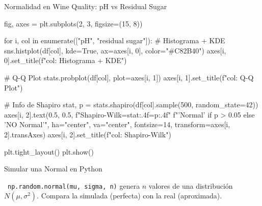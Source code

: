 \documentclass[aspectratio=169, 11pt]{beamer}
\begin{document}
\begin{frame}[fragile,shrink=28]{Normalidad en Wine Quality: pH vs Residual Sugar}
  \vspace{-6pt}
  \begin{pyblock}
fig, axes = plt.subplots(2, 3, figsize=(15, 8))

for i, col in enumerate(["pH", "residual sugar"]):
    # Histograma + KDE
    sns.histplot(df[col], kde=True, ax=axes[i, 0],
                 color="#C82B40")
    axes[i, 0].set_title(f"{col}: Histograma + KDE")

    # Q-Q Plot
    stats.probplot(df[col], plot=axes[i, 1])
    axes[i, 1].set_title(f"{col}: Q-Q Plot")

    # Info de Shapiro
    stat, p = stats.shapiro(df[col].sample(500,
                            random_state=42))
    axes[i, 2].text(0.5, 0.5,
        f"Shapiro-Wilk\nstat={stat:.4f}\np={p:.4f}\n"
        f"{'Normal' if p > 0.05 else 'NO Normal'}",
        ha="center", va="center", fontsize=14,
        transform=axes[i, 2].transAxes)
    axes[i, 2].set_title(f"{col}: Shapiro-Wilk")

plt.tight_layout()
plt.show()
  \end{pyblock}
\end{frame}

\begin{frame}[fragile,shrink=28]{Simular una Normal en Python}
  \vspace{-6pt}

  \vspace{4pt}
  {\scriptsize\color{textMuted}
    \faLightbulb\ \texttt{np.random.normal(mu, sigma, n)} genera $n$ valores
    de una distribución $N(\mu, \sigma^2)$.
    Compara la simulada (perfecta) con la real (aproximada).}
\end{frame}
\end{document}
